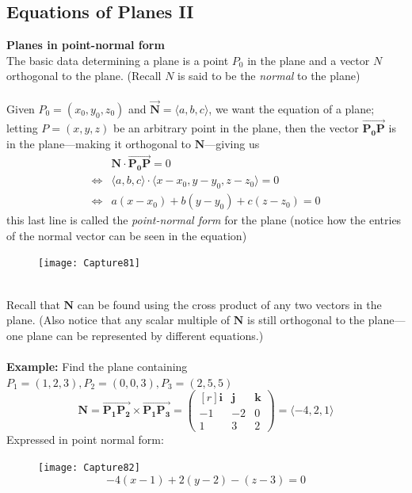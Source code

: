 \documentclass{report}
\begin{document}
\subsection{Equations of Planes II} %
\textbf{Planes in point-normal form}\\
The basic data determining a plane is a point $P_0$ in the plane and a vector
$N$ orthogonal to the plane. (Recall $N$ is said to be the \textit{normal} to the plane)\\
\vspace{1mm}\\
Given $P_0=(x_0,y_0,z_0)$ and $\overrightarrow{\mathbf{N}}=\langle a,b,c\rangle$, 
we want the equation of a plane; letting $P=(x,y,z)$ be an arbitrary point in the plane,
then the vector $\overrightarrow{\mathbf{P_0P}}$ is in the plane---making it 
orthogonal to $\mathbf{N}$---giving us
\begin{align*}
&\mathbf{N}\cdot\overrightarrow{\mathbf{P_0P}}=0\\
\iff&\langle a,b,c\rangle\cdot\langle x-x_0,y-y_0,z-z_0\rangle=0\\
\iff&a(x-x_0)+b(y-y_0)+c(z-z_0)=0
\end{align*}
this last line is called the \textit{point-normal form} for the plane
(notice how the entries of the normal vector can be seen in the equation)
\begin{figure}[h]
\texttt{[image: Capture81]}\\
\centering
\end{figure}\\
Recall that $\mathbf{N}$ can be found using the cross product of any two vectors in the plane.
(Also notice that any scalar multiple of $\mathbf{N}$ is still orthogonal to the plane---
one plane can be represented by different equations.)\\
\vspace{1mm}\\
\textbf{Example: }Find the plane containing $P_1=(1,2,3),P_2=(0,0,3),P_3=(2,5,5)$
\begin{equation*}
\mathbf{N}=\overrightarrow{\mathbf{P_1P_2}}\times\overrightarrow{\mathbf{P_1P_3}}=
\begin{pmatrix*}[r]
\mathbf{i}&\mathbf{j}&\mathbf{k}\\
-1&-2&0\\
1&3&2
\end{pmatrix*}
=\langle-4,2,1\rangle
\end{equation*}
Expressed in point normal form:
\begin{figure}[h]
\texttt{[image: Capture82]}\\
\centering
\begin{equation*}
-4(x-1)+2(y-2)-(z-3)=0
\end{equation*}
\end{figure}
\newpage
\end{document}
